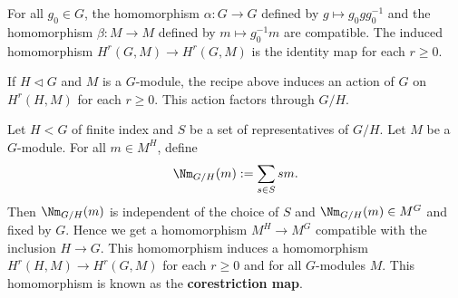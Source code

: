   \begin{example}
    For all $g_0 \in G$, the homomorphism $\alpha: G \to G$ defined by $g \mapsto g_0 g g_0^{-1}$ and the homomorphism $\beta: M \to M$ defined by $m \mapsto g_0^{-1} m$ are compatible.
    The induced homomorphism $H^r(G, M) \to H^r(G, M)$ is the identity map for each $r \geq 0$.
  \end{example}

  \begin{remark}
    If $H \triangleleft G$ and $M$ is a $G$-module, the recipe above induces an action of $G$ on $H^r(H, M)$ for each $r \geq 0$.
    This action factors through $G/H$. 
  \end{remark}

  \begin{example}
    Let $H < G$ of finite index and $S$ be a set of representatives of $G/H$.
    Let $M$ be a $G$-module.
    For all $m \in M^H$, define 
    \[  \Nm_{G/H}(m) := \sum_{s \in S} s m.  \]
    Then $\Nm_{G/H}(m)$ is independent of the choice of $S$ and $\Nm_{G/H}(m) \in M^G$ and fixed by $G$.
    Hence we get a homomorphism $M^H \to M^G$ compatible with the inclusion $H \to G$.
    This homomorphism induces a homomorphism $H^r(H, M) \to H^r(G, M)$ for each $r \geq 0$ and for all $G$-modules $M$.
    This homomorphism is known as the \textbf{corestriction map}.
    
  \end{example}
